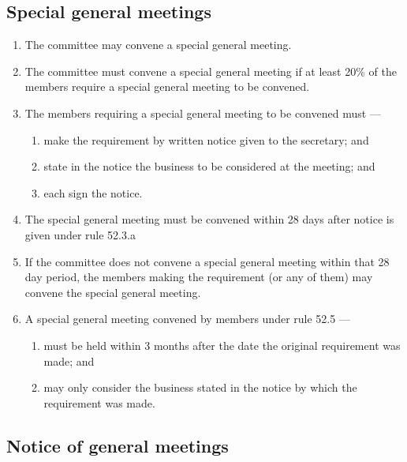 \documentclass[../constitution.tex]{subfiles}
\begin{document}
\hypertarget{special-general-meetings}{%
\subsection{Special general meetings}\label{special-general-meetings}}

\begin{enumerate}

\item The committee may convene a special general meeting.
\item The committee must convene a special general meeting if at least 20\% of the members require a special general meeting to be convened.
\item The members requiring a special general meeting to be convened must ---

  \begin{enumerate}
  
  \item make the requirement by written notice given to the secretary; and
  \item state in the notice the business to be considered at the meeting; and
  \item each sign the notice.
  \end{enumerate}
\item The special general meeting must be convened within 28 days after notice is given under rule 52.3.a
\item If the committee does not convene a special general meeting within that 28 day period, the members making the requirement (or any of them) may convene the special general meeting.
\item A special general meeting convened by members under rule 52.5 ---

  \begin{enumerate}
  
  \item must be held within 3 months after the date the original requirement was made; and
  \item may only consider the business stated in the notice by which the requirement was made.
  \end{enumerate}
\end{enumerate}

\hypertarget{notice-of-general-meetings}{%
\subsection{Notice of general meetings}\label{notice-of-general-meetings}}
\end{document}
